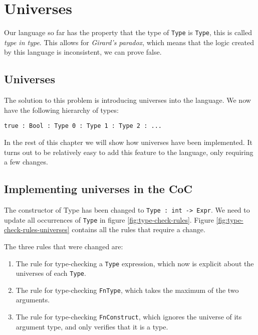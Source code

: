 \chapter{Universes}
\label{ch:universes}

Our language so far has the property that the type of \verb|Type| is \verb|Type|, this is called \emph{type in type}. This allows for \emph{Girard's paradox}, which means that the logic created by this language is inconsistent, we can prove false. 

\section{Universes}

The solution to this problem is introducing universes into the language. We now have the following hierarchy of types:
\begin{lstlisting}
true : Bool : Type 0 : Type 1 : Type 2 : ...
\end{lstlisting}

In the rest of this chapter we will show how universes have been implemented. It turns out to be relatively easy to add this feature to the language, only requiring a few changes.

\section{Implementing universes in the CoC}

The constructor of Type has been changed to \verb|Type : int -> Expr|. We need to update all occurrences of \verb|Type| in figure \ref{fig:type-check-rules}. Figure \ref{fig:type-check-rules-universes} contains all the rules that require a change.

The three rules that were changed are:
\begin{enumerate}
	\item The rule for type-checking a \verb|Type| expression, which now is explicit about the universes of each \verb|Type|.
	\item The rule for type-checking \verb|FnType|, which takes the maximum of the two arguments.
	\item The rule for type-checking \verb|FnConstruct|, which ignores the universe of its argument type, and only verifies that it is a type.
\end{enumerate}

